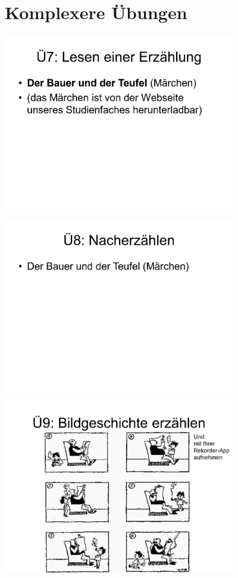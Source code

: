 \documentclass[
  letterpaper,
]{scrbook}
\begin{document}
\hypertarget{sec-komplex}{%
\chapter{Komplexere Übungen}\label{sec-komplex}}

\includegraphics[width=4in,height=\textheight]{./pictures/sprachlabor/Phonetikuebungen_S01_Page25.png}

\includegraphics[width=4in,height=\textheight]{./pictures/sprachlabor/Phonetikuebungen_S01_Page26.png}

\includegraphics[width=4in,height=\textheight]{./pictures/sprachlabor/Phonetikuebungen_S01_Page27.png}
\end{document}
